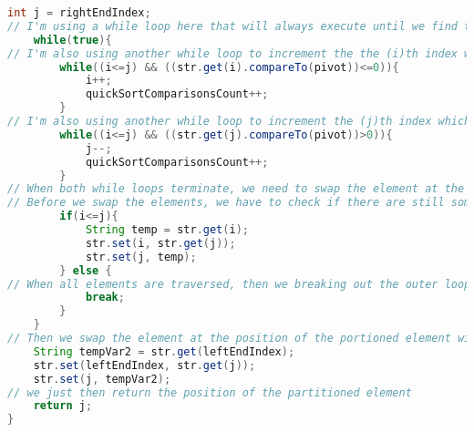 \documentclass{article}
\begin{document}
\begin{lstlisting}[language=Java]
    int j = rightEndIndex;
// I'm using a while loop here that will always execute until we find the position of the partitioned element. Then we will break out the loop once we find that.
    while(true){
// I'm also using another while loop to increment the the (i)th index which is on the left sub-list and will compare its values with the pivot. This loop will terminate if the value at the (i)th index is greater than pivot. 
        while((i<=j) && ((str.get(i).compareTo(pivot))<=0)){
            i++;
            quickSortComparisonsCount++;
        }
// I'm also using another while loop to increment the (j)th index which is on the right sub-list and will compare its values with the pivot. This loop will terminate if the value at the (j)th index is less than pivot. Because, we want to keep all the value greater than the pivot on the right as well as keeping the ones less than the pivot on the left side.
        while((i<=j) && ((str.get(j).compareTo(pivot))>0)){
            j--;
            quickSortComparisonsCount++;
        }
// When both while loops terminate, we need to swap the element at the (i)th index with the one at (j)th index since they didn't satisfy the conditions in the above two while loops. 
// Before we swap the elements, we have to check if there are still some elements that we didn't visit using this condition in the following if statement (i<=j) 
        if(i<=j){
            String temp = str.get(i);
            str.set(i, str.get(j));
            str.set(j, temp);
        } else {
// When all elements are traversed, then we breaking out the outer loop, which also means that we have found the position of the portioning element 
            break;
        }
    }
// Then we swap the element at the position of the portioned element with the first element in the ArrayList which we chose as our pivot. 
    String tempVar2 = str.get(leftEndIndex);
    str.set(leftEndIndex, str.get(j));
    str.set(j, tempVar2);
// we just then return the position of the partitioned element
    return j;  
}


\end{lstlisting}
\end{document}
